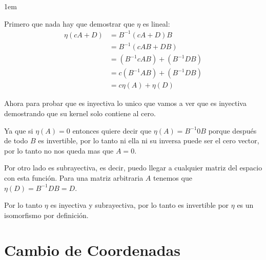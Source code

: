 \documentclass[12pt, fleqn]{report}                             %
\newenvironment{SmallIndentation}[1][0.75em]                    %
        {\begin{adjustwidth}{#1}{}\begin{footnotesize}}             %
        {\end{footnotesize}\end{adjustwidth}}                       %
\theoremstyle{break}                                            %
\begin{document}
\begin{itemize}
\begin{SmallIndentation}[1em]
                            Primero que nada hay que demostrar que $\eta$ es lineal:
                            \begin{align*}
                                \eta(cA + D)
                                    &= B^{-1}(cA + D)B                  \\
                                    &= B^{-1}(cAB + DB)                 \\
                                    &= (B^{-1}cAB) + (B^{-1}DB)         \\
                                    &= c(B^{-1}AB) + (B^{-1}DB)         \\
                                    &= c \eta(A) + \eta(D)              
                            \end{align*}

                            Ahora para probar que es inyectiva lo unico que vamos a ver
                            que es inyectiva demostrando que su kernel solo contiene al cero.

                            Ya que si $\eta(A) = 0$ entonces quiere decir que $\eta(A) = B^{-1}0B$
                            porque después de todo $B$ es invertible, por lo tanto ni ella ni su inversa
                            puede ser el cero vector, por lo tanto no nos queda mas que $A = 0$.

                            Por otro lado es subrayectiva, es decir, puedo llegar a cualquier matriz
                            del espacio con esta función. Para una matriz arbitraria $A$ tenemos que
                            $\eta(D) = B^{-1}DB = D$.

                            Por lo tanto $\eta$ es inyectiva y subrayectiva, por lo tanto es invertible
                            por $\eta$ es un isomorfismo por definición.
                        
                        \end{SmallIndentation}
                            
                \end{itemize}
            


        \clearpage
        \section{Cambio de Coordenadas}
\end{document}
